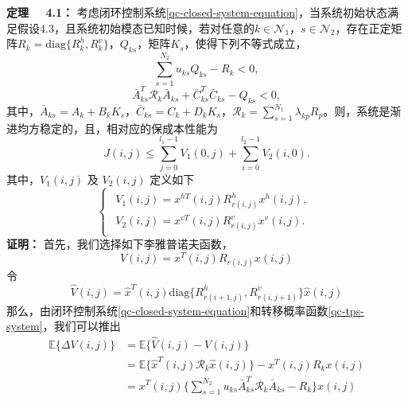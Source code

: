 	{\bf 定理 \ \ 4.1：} 
	考虑闭环控制系统\eqref{qc-closed-system-equation}，当系统初始状态满足假设4.3，且系统初始模态已知时候，若对任意的$k\in\mathcal{N}_{1}$，$s\in\mathcal{N}_2$，存在正定矩阵$R_{k}=\mathrm{diag}\{R^{h}_{k},R^{v}_{k}\}$，$Q_{ks}$，矩阵$K_{s}$，使得下列不等式成立，
	\begin{equation}\label{qc-T1-1}
	\sum_{s=1}^{N_2}u_{ks}Q_{ks}-R_{k}< 0,
	\end{equation}
	\begin{equation}\label{qc-T1-2}
	\bar{A}^{T}_{ks}\mathcal{R}_{k}\bar{A}_{ks}+\bar{C}^{T}_{ks}\bar{C}_{ks}-Q_{ks}<0,
	\end{equation}
	其中，$\bar{A}_{ks}=A_{k}+B_kK_s$，$\bar{C}_{ks}=C_k+D_kK_s$，$\mathcal{R}_{k}=\sum_{s =1}^{N_1}\lambda_{kp}R_p$。则，系统是渐进均方稳定的，且，相对应的保成本性能为
	\begin{equation}\label{qcT1C3}
		J(i,j)\leq  \sum_{j=0}^{l_1-1}V_{1}(0,j)+\sum_{i=0}^{l_2-1}V_2(i,0).
	\end{equation}
	其中，$V_{1}(i,j)$ 及 $V_{2}(i,j)$ 定义如下  
	\begin{equation*}
	\left\{
	\begin{array}{lr}
	\begin{split}
	V_{1}(i,j)=x^{hT}(i,j)R^{h}_{r(i,j)}x^{h}(i,j),\\
	V_{2}(i,j)=x^{vT}(i,j)R^{v}_{r(i,j)}x^{v}(i,j).
	\end{split}
	\end{array}
	\right.
	\end{equation*}
	{\bf 证明：} 
	首先，我们选择如下李雅普诺夫函数，
	\begin{equation*}
		V(i,j) = x^{T}(i,j)R_{r(i,j)}x(i,j)
	\end{equation*}
	令
	\begin{equation*}
	\hat{V}(i,j) = \hat{x}^{T}(i,j)\mathrm{diag}\{R^{h}_{r(i+1,j)},R^{v}_{r(i,j+1)}\}\hat{x}(i,j)
	\end{equation*}
	那么，由闭环控制系统\eqref{qc-closed-system-equation}和转移概率函数\eqref{qc-tps-system}，我们可以推出
	\begin{equation}\label{qc-diff1}
		\begin{split}
			\mathbb{E}\{\varDelta V(i,j)\}&=\mathbb{E}\{\hat{V}(i,j)-V(i,j) \}\\
				&=\mathbb{E}\{\hat{x}^{T}(i,j)\mathcal{R}_{k}\hat{x}(i,j) \}- x^{T}(i,j)R_{k}x(i,j)\\
				&= x^{T}(i,j)\{\sum_{s=1}^{N_2}u_{ks} \bar{A}^{T}_{ks}\mathcal{R}_{k}\bar{A}_{ks} -R_{k} \}x(i,j)  
		\end{split}
	\end{equation}
